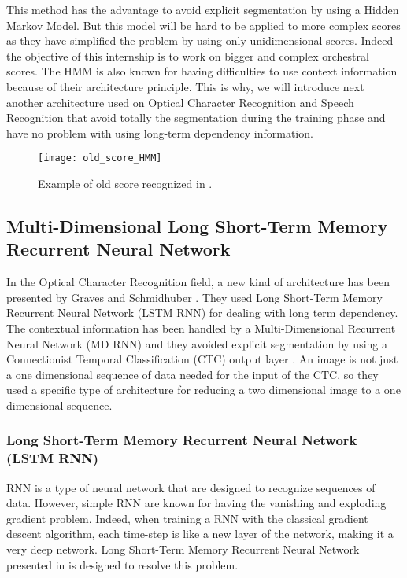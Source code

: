 \documentclass[11pt]{sdm}
\begin{document}
This method has the advantage to avoid explicit segmentation by using a Hidden Markov Model.
But this model will be hard to be applied to more complex scores as they have simplified the problem by using only unidimensional scores.
Indeed the objective of this internship is to work on bigger and complex orchestral scores.
The HMM is also known for having difficulties to use context information because of their architecture principle.
This is why, we will introduce next another architecture used on Optical Character Recognition and Speech Recognition that avoid totally the segmentation during the training phase and have no problem with using long-term dependency information.
\begin{figure}[btp]
  \texttt{[image: old\_score\_HMM]}
  \caption{\label{old_score_HMM} Example of old score recognized in \cite{pugin_optical_2006}. }
\end{figure}

\subsection{Multi-Dimensional Long Short-Term Memory Recurrent Neural Network}

In the Optical Character Recognition field, a new kind of architecture has been presented by Graves and Schmidhuber \cite{graves_offline_2009}.
They used Long Short-Term Memory Recurrent Neural Network (LSTM RNN) \cite{hochreiter_long_1997} for dealing with long term dependency.
The contextual information has been handled by a Multi-Dimensional Recurrent Neural Network (MD RNN) and they avoided explicit segmentation by using a Connectionist Temporal Classification (CTC) output layer \cite{graves_connectionist_2006}.
An image is not just a one dimensional sequence of data needed for the input of the CTC, so they used a specific type of architecture for reducing a two dimensional image to a one dimensional sequence.

\subsubsection{Long Short-Term Memory Recurrent Neural Network (LSTM RNN)}

RNN is a type of neural network that are designed to recognize sequences of data.
However, simple RNN are known for having the vanishing and exploding gradient problem.
Indeed, when training a RNN with the classical gradient descent algorithm, each time-step is like a new layer of the network, making it a very deep network.
Long Short-Term Memory Recurrent Neural Network presented in \cite{hochreiter_long_1997} is designed to resolve this problem.
\end{document}
